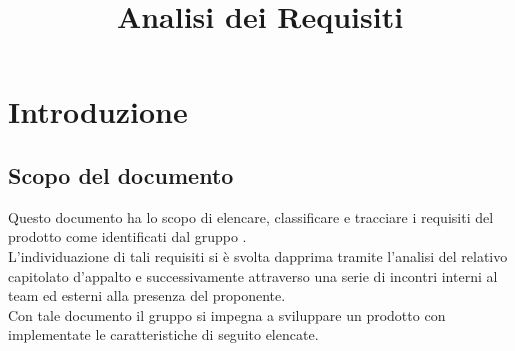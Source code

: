 

\usepackage{hyperref}
\usepackage{longtable}
\hypersetup{hidelinks}

\author{\ALL}
\supervisor{\ALL}
\title{Analisi dei Requisiti}

\renewcommand{\arraystretch}{1.5}
\setcounter{tocdepth}{4}
\setcounter{secnumdepth}{4}


\maketitle

\tableofcontents
\listoffigures

\newpage

\newcommand{\myimg}[1]
{

\begin{figure}[H]
\makebox[\textwidth][c]
{
\texttt{[image: Diagrammi casi d'uso/\#1]}
}
\caption{#1}
\label{#1}
\end{figure}

}
\newcommand{\myimgsmall}[1]
{

\begin{figure}[H]
\makebox[\textwidth][c]
{
\texttt{[image: Diagrammi casi d'uso/\#1]}
}
\caption{#1}
\label{#1}

\end{figure}

}

\newcommand{\myimgvsmall}[1]
{

\begin{figure}[H]
\makebox[\textwidth][c]
{
\texttt{[image: Diagrammi casi d'uso/\#1]}
}
\caption{#1}
\label{#1}

\end{figure}

}


\section{Introduzione}
	\subsection{Scopo del documento}
	Questo documento ha lo scopo di elencare, classificare e tracciare i requisiti del prodotto \proj{} come identificati dal gruppo \hx{}. 
	\\L'individuazione di tali requisiti si è svolta dapprima tramite l'analisi del relativo capitolato d'appalto e successivamente attraverso una serie di incontri interni al team ed esterni alla presenza del proponente.
	\\Con tale documento il gruppo \hx{} si impegna a sviluppare un prodotto con implementate le caratteristiche di seguito elencate.

